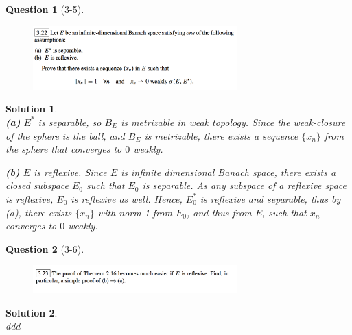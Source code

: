 \documentclass{article} %
\theoremstyle{quest}
\newtheorem*{question}{Question}
\newtheorem*{solution}{Solution}
\begin{document}
\newpage

\begin{question}[3-5]
\hfill
\begin{figure}[h!]
  \centering
    \includegraphics[width=0.7\textwidth]{func-c3-p5.png}
\end{figure}
\end{question}
\begin{solution} \hfill \\
\textbf{(a)} $E^*$ is separable, so $B_{E}$ is metrizable in weak topology. Since 
the weak-closure of the sphere is the ball, and $B_{E}$ is metrizable, there
exists a sequence $\{x_n\}$ from the sphere that converges to $0$ weakly.

\textbf{(b)} 
$E$ is reflexive. Since $E$ is infinite dimensional Banach space, there 
exists a closed subspace $E_0$ such that $E_0$ is separable. As any subspace
of a reflexive space is reflexive, $E_0$ is reflexive as well. Hence, $
E_0^{*}$ is reflexive and separable, thus by (a), there exists $\{x_n\}$
with norm 1 from $E_0$, and thus from $E$, such that $x_n$ converges to $0$
weakly. 

\end{solution}

\newpage

\begin{question}[3-6]
\hfill
\begin{figure}[h!]
  \centering
    \includegraphics[width=0.7\textwidth]{func-c3-p6.png}
\end{figure}
\end{question}
\begin{solution} \hfill \\
ddd 
\end{solution}

\newpage
\end{document}

